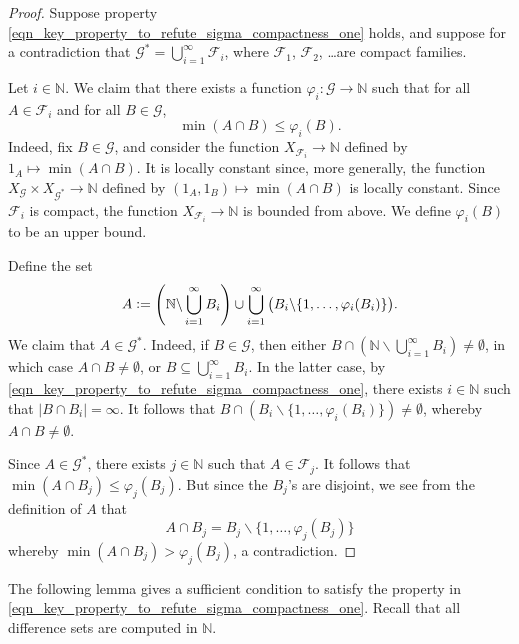 \documentclass[letter,11pt]{article}
\theoremstyle{plain}
\theoremstyle{definition}
\theoremstyle{plain}
\theoremstyle{plain}
\numberwithin{equation}{section}
\newcommand{\N}{\mathbb{N}}
\newcommand{\defeq}{\vcentcolon=}
\renewcommand{\leq}{\leqslant}
\renewcommand{\setminus}{\backslash}
\newcommand{\class}{\mathscr{F}}
\newcommand{\classtwo}{\mathscr{G}}
\begin{document}
\begin{proof}
    Suppose property \eqref{eqn_key_property_to_refute_sigma_compactness_one} holds, and suppose for a contradiction that $\classtwo^* = \bigcup_{i=1}^\infty \class_i$, where $\class_1$, $\class_2$, \dots are compact families.

    Let $i \in \N$.  We claim that there exists a function $\varphi_i: \classtwo \to \N$ such that for all $A \in \class_i$ and for all $B \in \classtwo$,
    \[\min (A \cap B) \leq \varphi_i(B).\]
    Indeed, fix $B \in \classtwo$, and consider the function $X_{\class_i} \to \N$ defined by $1_A \mapsto \min (A \cap B)$.  It is locally constant since, more generally, the function $X_{\classtwo} \times X_{\classtwo^*} \to \N$ defined by $(1_A,1_B) \mapsto \min (A \cap B)$ is locally constant. Since $\class_i$ is compact, the function $X_{\class_i} \to \N$ is bounded from above.  We define $\varphi_i(B)$ to be an upper bound.

    Define the set
    \[A \defeq \left( \N \setminus \bigcup_{i=1}^\infty B_i \right) \cup \bigcup_{i=1}^\infty \big( B_i \setminus \{1, \ldots, \varphi_i(B_i) \} \big).\]
    We claim that $A \in \classtwo^*$.  Indeed, if $B \in \classtwo$, then either $B \cap ( \N \setminus \bigcup_{i=1}^\infty B_i ) \neq \emptyset$, in which case $A \cap B \neq \emptyset$, or $B \subseteq \bigcup_{i=1}^\infty B_i$.  In the latter case, by \eqref{eqn_key_property_to_refute_sigma_compactness_one}, there exists $i \in \N$ such that $|B \cap B_i| = \infty$.  It follows that $B \cap (B_i \setminus \{1, \ldots, \varphi_i(B_i) \}) \neq \emptyset$, whereby $A \cap B \neq \emptyset$.

    Since $A \in \classtwo^*$, there exists $j \in \N$ such that $A \in \class_j$.  It follows that $\min (A \cap B_j) \leq \varphi_j(B_j)$. But since the $B_j$'s are disjoint, we see from the definition of $A$ that
    \[A \cap B_j = B_j \setminus \{1, \ldots, \varphi_j(B_j) \}\]
    whereby $\min (A \cap B_j) > \varphi_j(B_j)$, a contradiction.
\end{proof}

The following lemma gives a sufficient condition to satisfy the property in \eqref{eqn_key_property_to_refute_sigma_compactness_one}.  Recall that all difference sets are computed in $\N$.
\end{document}
